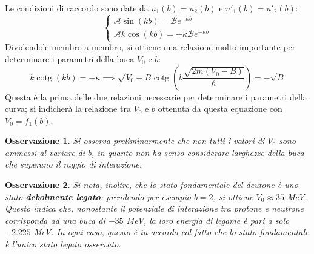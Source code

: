 \documentclass[11pt, a4paper]{scrartcl}
\theoremstyle{style}
\newtheorem{osservazione}{Osservazione}[section]
\numberwithin{equation}{subsection}
\begin{document}
Le condizioni di raccordo sono date da $u_1(b) = u_2(b)$ e $u'_1(b) = u'_2(b)$:
\[
\begin{cases}
	\mathcal{A} \sin (kb) = \mathcal{B} e^{-\kappa b} \\
	\mathcal{A} k \cos (kb) = - \kappa \mathcal{B} e^{-\kappa b}
\end{cases}
\] 
Dividendole membro a membro, si ottiene una relazione molto importante per determinare i parametri della buca $V_0$ e $b$:
\begin{equation}
	k \operatorname{cotg}  (kb) = - \kappa \implies \sqrt{V_0- B} \operatorname{cotg}  \left(b \frac{\sqrt{2m(V_0-B)} }{\hbar }\right)  = - \sqrt{B} 
\end{equation}
Questa \`e la prima delle due relazioni necessarie per determinare i parametri della curva; si indicher\`a la relazione tra $V_0$ e $b$ ottenuta da questa equazione con $V_0 = f_1(b)$.
\begin{osservazione}
Si osserva preliminarmente che non tutti i valori di $V_0$ sono ammessi al variare di $b$, in quanto non ha senso considerare larghezze della buca che superano il raggio di interazione.
\end{osservazione}
\begin{osservazione}
Si nota, inoltre, che lo stato fondamentale del deutone \`e uno stato \textbf{debolmente legato}: prendendo per esempio $b=2$, si ottiene $V_0\approx 35$ MeV. 
Questo indica che, nonostante il potenziale di interazione tra protone e neutrone corrisponda ad una buca di $-35$ MeV, la loro energia di legame \`e pari a solo $-2.225$ MeV.
In ogni caso, questo \`e in accordo col fatto che lo stato fondamentale \`e l'unico stato legato osservato.
\end{osservazione}
\end{document}
